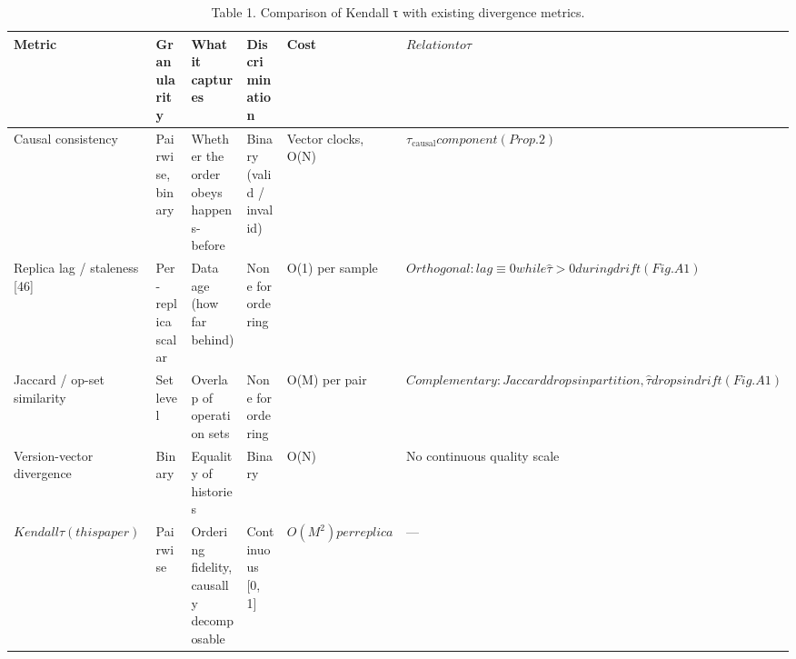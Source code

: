 \documentclass[10pt,twocolumn]{article}
\begin{document}
\begin{table}[t]
\centering
\caption{Table 1. Comparison of Kendall τ with existing divergence metrics.}
\begin{tabular}{llllll}
\hline
Metric & Granularity & What it captures & Discrimination & Cost & $Relation to \tau$ \\
\hline
Causal consistency & Pairwise, binary & Whether the order obeys happens-before & Binary (valid / invalid) & Vector clocks, O(N) & $\tau_{\mathrm{causal}} component (Prop. 2)$ \\
Replica lag / staleness [46] & Per-replica scalar & Data age (how far behind) & None for ordering & O(1) per sample & $Orthogonal: lag ≡ 0 while \hat{\tau} > 0 during drift (Fig. A1)$ \\
Jaccard / op-set similarity & Set level & Overlap of operation sets & None for ordering & O(M) per pair & $Complementary: Jaccard drops in partition, \hat{\tau} drops in drift (Fig. A1)$ \\
Version-vector divergence & Binary & Equality of histories & Binary & O(N) & No continuous quality scale \\
$Kendall \tau (this paper)$ & Pairwise & Ordering fidelity, causally decomposable & Continuous [0, 1] & $O(M^{2}) per replica$ & — \\

\end{tabular}
\end{table}
\end{document}
